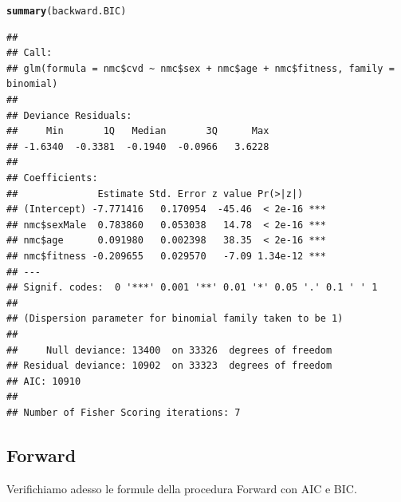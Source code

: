 \documentclass{article}\usepackage[]{graphicx}\usepackage[]{xcolor}
\makeatletter
\newcommand{\hlstd}[1]{\textcolor[rgb]{0.345,0.345,0.345}{#1}}%
\newcommand{\hlkwd}[1]{\textcolor[rgb]{0.737,0.353,0.396}{\textbf{#1}}}%
\newenvironment{kframe}{%
 \def\at@end@of@kframe{}%
 \ifinner\ifhmode%
  \def\at@end@of@kframe{\end{minipage}}%
  \begin{minipage}{\columnwidth}%
 \fi\fi%
 \def\FrameCommand##1{\hskip\@totalleftmargin \hskip-\fboxsep
 \colorbox{shadecolor}{##1}\hskip-\fboxsep
     \hskip-\linewidth \hskip-\@totalleftmargin \hskip\columnwidth}%
 \MakeFramed {\advance\hsize-\width
   \@totalleftmargin\z@ \linewidth\hsize
   \@setminipage}}%
 {\par\unskip\endMakeFramed%
 \at@end@of@kframe}
\newenvironment{knitrout}{}{} %
\makeatother
\begin{document}
\begin{knitrout}
\begin{kframe}
\begin{verbatim}
\end{verbatim}
\begin{alltt}
\hlkwd{summary}\hlstd{(backward.BIC)}
\end{alltt}
\begin{verbatim}
## 
## Call:
## glm(formula = nmc$cvd ~ nmc$sex + nmc$age + nmc$fitness, family = binomial)
## 
## Deviance Residuals: 
##     Min       1Q   Median       3Q      Max  
## -1.6340  -0.3381  -0.1940  -0.0966   3.6228  
## 
## Coefficients:
##              Estimate Std. Error z value Pr(>|z|)    
## (Intercept) -7.771416   0.170954  -45.46  < 2e-16 ***
## nmc$sexMale  0.783860   0.053038   14.78  < 2e-16 ***
## nmc$age      0.091980   0.002398   38.35  < 2e-16 ***
## nmc$fitness -0.209655   0.029570   -7.09 1.34e-12 ***
## ---
## Signif. codes:  0 '***' 0.001 '**' 0.01 '*' 0.05 '.' 0.1 ' ' 1
## 
## (Dispersion parameter for binomial family taken to be 1)
## 
##     Null deviance: 13400  on 33326  degrees of freedom
## Residual deviance: 10902  on 33323  degrees of freedom
## AIC: 10910
## 
## Number of Fisher Scoring iterations: 7
\end{verbatim}
\end{kframe}
\end{knitrout}
          
    \subsection{Forward} 
      Verifichiamo adesso le formule della procedura Forward con AIC e BIC.
\end{document}
